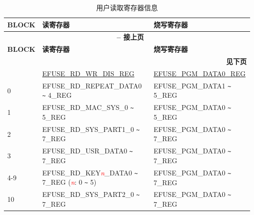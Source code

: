 \begin{longtable}[c]{|l|l|l|}
\caption{用户读取寄存器信息}
\label{tab:efuse-softw-read-para}
    \\\hline
    \rowcolor{lightgray}
        \textbf{BLOCK} & \textbf{读寄存器} & \textbf{烧写寄存器}\\
    \endfirsthead
    
    \multicolumn{3}{c}{\bfseries \tablename\ \thetable{} -- 接上页}\\\hline
    
    \rowcolor{lightgray}
        \textbf{BLOCK} & \textbf{读寄存器} & \textbf{烧写寄存器}\\
    \endhead
    
    \multicolumn{3}{r}{\textbf{见下页}} \\
    \endfoot
    \endlastfoot
    \hline
0 & \hyperref[regdesc:EFUSERDWRDISREG]{EFUSE\_RD\_WR\_DIS\_REG} & \hyperref[regdesc:EFUSEPGMDATA0REG]{EFUSE\_PGM\_DATA0\_REG} \\\hline
0 & EFUSE\_RD\_REPEAT\_DATA0 \verb+~+ 4\_REG & EFUSE\_PGM\_DATA1 \verb+~+ 5\_REG \\\hline
1 & EFUSE\_RD\_MAC\_SYS\_0 \verb+~+ 5\_REG & EFUSE\_PGM\_DATA0 \verb+~+ 5\_REG \\\hline
2 & EFUSE\_RD\_SYS\_PART1\_0 \verb+~+ 7\_REG & EFUSE\_PGM\_DATA0 \verb+~+ 7\_REG \\\hline
3 & EFUSE\_RD\_USR\_DATA0 \verb+~+ 7\_REG & EFUSE\_PGM\_DATA0 \verb+~+ 7\_REG \\ \hline
4-9 & EFUSE\_RD\_KEY\textcolor{red}{\it{n}}\_DATA0 \verb+~+ 7\_REG (\textcolor{red}{\it{n}}: 0 \verb+~+ 5) & EFUSE\_PGM\_DATA0 \verb+~+ 7\_REG \\\hline
10 & EFUSE\_RD\_SYS\_PART2\_0 \verb+~+ 7\_REG & EFUSE\_PGM\_DATA0 \verb+~+ 7\_REG \\\hline
\end{longtable}
